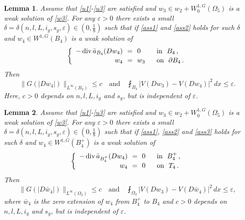 \documentclass[10pt,a4paper]{amsart}
\newtheorem{lemma}{Lemma}
\begin{document}
	\begin{lemma}\label{w3w4l}
	Assume that \eqref{u1}-\eqref{u3} are satisfied and   $w_3 \in w_2+ W_0^{1,G}(\Omega_5)$  is a weak solution of \eqref{w3}. 
	For any $\varepsilon > 0$ there exists a small $\delta=\delta(n,l,L,i_g,s_g,\varepsilon) \in (0,\frac{1}{8})$ such that if \eqref{ass1}  and \eqref{ass2}   holds for such $\delta$ and  $w_4 \in W^{1,G}(B_4)$ is a weak solution of 
	\begin{equation*} 
		\left\{\begin{array}{r@{\ \ }c@{\ \ }ll}
			-\operatorname{div}\bar{a}_{B_4}(Dw_4) &=&0 \ \ &\mbox{in}\ \   B_4 \,,  \\[0.05cm]
			w_4 &=&w_3 \ \ &\mbox{on}\ \ \partial B_4 \,.
		\end{array}\right.
	\end{equation*}
	Then
	\begin{equation*} 
		\|G(|Dw_4|)\|_{L^{\infty}(B_2)} \leq c \quad \text{and} \quad \fint_{B_4} |V(Dw_3)-V(Dw_4)|^2\,dx \leq \varepsilon.  
	\end{equation*}
	Here, $c > 0$ depends on $n,l,L,i_g$ and $s_g$, but is independent of $\varepsilon$.
\end{lemma}

		\begin{lemma}\label{w3w4b}
		Assume that \eqref{u1}-\eqref{u3} are satisfied and   $w_3 \in w_2+ W_0^{1,G}(\Omega_5)$  is a weak solution of \eqref{w3}. 
		For any $\varepsilon > 0$ there exists a small $\delta=\delta(n,l,L,i_g,s_g,\varepsilon) \in (0,\frac{1}{8})$ such that if \eqref{ass1},  \eqref{ass2} and \eqref{ass3} holds for such $\delta$ and  $w_4 \in W^{1,G}(B_4^+)$ is a weak solution of 
		\begin{equation*} 
			\left\{\begin{array}{r@{\ \ }c@{\ \ }ll}
				-\operatorname{div}\bar{a}_{B_4^+}(Dw_4) &=&0 \ \ &\mbox{in}\ \   B_4^+ \,,  \\[0.05cm]
				w_4 &=&0 \ \ &\mbox{on}\ \   T_4 \,.
			\end{array}\right.
		\end{equation*}
		Then
		\begin{equation*} 
			\|G(|D\bar{w}_4|)\|_{L^{\infty}(\Omega_2)} \leq c \quad \text{and} \quad \fint_{\Omega_3} |V(Dw_3)-V(D\bar{w}_4)|^2\,dx \leq \varepsilon,  
		\end{equation*}
	where $\bar{w}_4$ is the zero extension of $w_4$ from $B_4^+$ to $B_4$ and $c > 0$ depends on $n,l,L,i_g$ and $s_g$, but is independent of $\varepsilon$.
	\end{lemma}
\end{document}
